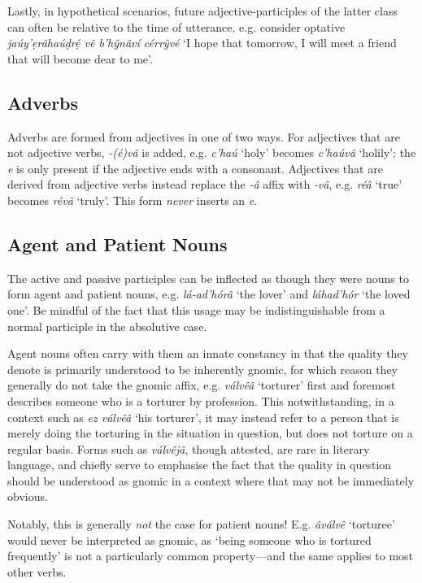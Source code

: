 \documentclass[a4paper, 12pt, twoside, openright, final]{book}
\let \w \textit
\begin{document}
Lastly, in hypothetical scenarios, future adjective-participles of the latter class can often be relative to the time of
utterance, e.g. consider optative \w{jaúy’ẹrâhaúḍrẹ́ vê b’hŷnâví cérrŷvé} ‘I hope that tomorrow, I will meet a friend that
will become dear to me’.

\subsection{Adverbs}
Adverbs are formed from adjectives in one of two ways. For adjectives that are not adjective verbs, \w{-(é)vâ} is added,
e.g. \w{c’haú} ‘holy’ becomes \w{c’haúvâ} ‘holily’; the \w{e} is only present if the adjective ends with a consonant. Adjectives that
are derived from adjective verbs instead replace the \w{-â} affix with \w{-vâ}, e.g. \w{réâ} ‘true’ becomes \w{révâ} ‘truly’. This
form \textit{never} inserts an \textit{e}.

\subsection{Agent and Patient Nouns}%
The active and passive participles can be inflected as though they were nouns to form agent and
patient nouns, e.g. \w{lá-ad’hórâ} ‘the lover’ and \w{láhad’hór} ‘the loved one’. Be mindful of the fact
that this usage may be indistinguishable from a normal participle in the absolutive case.

Agent nouns often carry with them an innate constancy in that the quality they denote
is primarily understood to be inherently gnomic, for which reason they generally do not take the gnomic affix,
e.g. \w{válvêâ} ‘torturer’ first and foremost describes someone who is a torturer by profession. This notwithstanding,
in a context such as \w{ez válvêâ} ‘his torturer’, it may instead refer to a person that is merely doing the torturing in the
situation in question, but does not torture on a regular basis. Forms such as \w{válvêjâ}, though attested, are rare in
literary language, and chiefly serve to emphasise the fact that the quality in question should be understood as gnomic
in a context where that may not be immediately obvious.

Notably, this is generally \textit{not} the case for patient nouns! E.g. \w{âválvê} ‘torturee’ would never be interpreted
as gnomic, as ‘being someone who is tortured frequently’ is not a particularly common property—and the same applies to
most other verbs.

\end{document}
